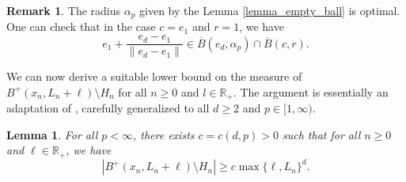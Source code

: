 \documentclass[a4paper, 11pt]{article}
\theoremstyle{plain}
\newtheorem{Lemma}[Theorem]{Lemma}
\theoremstyle{definition}
\newtheorem{Remark}[Theorem]{Remark}
\newcommand{\R}{\mathbb{R}}
\numberwithin{equation}{section}
\begin{document}
\begin{Remark}
    The radius $\alpha_p$ given by the Lemma \ref{lemma_empty_ball} is optimal. One can check that in the case $c=e_1$ and $r=1$, we have
        \[e_1+\frac{e_d-e_1}{\|e_d-e_1\|}\in \overline B\left(e_d, \alpha_p\right)\cap\overline B(c, r).\]
\end{Remark}


We can now derive a suitable lower bound on the measure of $B^+(x_n,L_n+\ell)\setminus H_n$ for all $n\geq 0$ and $l\in\R_+$. The argument is essentially an adaptation of \cite[Lemma 3.2]{Dsf2d}, carefully generalized to all $d\geq 2$ and $p\in[1,\infty)$.


\begin{Lemma}
    \label{lemma_area_lp}
    For all $p<\infty$, there exists $c=c(d, p)>0$ such that for all $n\geq0$ and $\ell\in\R_+$, we have
        \[|B^+(x_n,L_n+\ell)\setminus H_n|\geq c\max\{\ell, L_n\}^d.\]
\end{Lemma}
\end{document}

